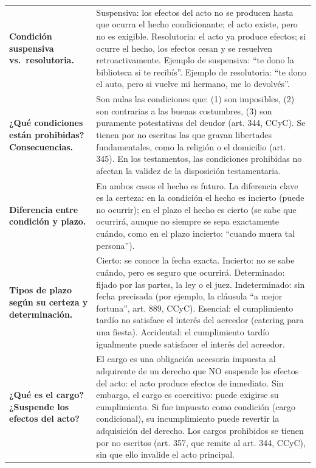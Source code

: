 \documentclass[12pt,oneside]{book}
\begin{document}
\begin{longtable}{
    >{\raggedright\arraybackslash}p{}
    >{\raggedright\arraybackslash}p{}
}
\textbf{Condición suspensiva vs.\ resolutoria.} &
Suspensiva: los efectos del acto no se producen hasta que ocurra el hecho condicionante; el acto existe, pero no es exigible. Resolutoria: el acto ya produce efectos; si ocurre el hecho, los efectos cesan y se resuelven retroactivamente. Ejemplo de suspensiva: ``te dono la biblioteca si te recibís''. Ejemplo de resolutoria: ``te dono el auto, pero si vuelve mi hermano, me lo devolvés''. \\

\textbf{¿Qué condiciones están prohibidas? Consecuencias.} &
Son nulas las condiciones que: (1) son imposibles, (2) son contrarias a las buenas costumbres, (3) son puramente potestativas del deudor (art. 344, CCyC). Se tienen por no escritas las que gravan libertades fundamentales, como la religión o el domicilio (art. 345). En los testamentos, las condiciones prohibidas no afectan la validez de la disposición testamentaria. \\

\textbf{Diferencia entre condición y plazo.} &
En ambos casos el hecho es futuro. La diferencia clave es la certeza: en la condición el hecho es incierto (puede no ocurrir); en el plazo el hecho es cierto (se sabe que ocurrirá, aunque no siempre se sepa exactamente cuándo, como en el plazo incierto: ``cuando muera tal persona''). \\

\textbf{Tipos de plazo según su certeza y determinación.} &
Cierto: se conoce la fecha exacta. Incierto: no se sabe cuándo, pero es seguro que ocurrirá. Determinado: fijado por las partes, la ley o el juez. Indeterminado: sin fecha precisada (por ejemplo, la cláusula ``a mejor fortuna'', art. 889, CCyC). Esencial: el cumplimiento tardío no satisface el interés del acreedor (catering para una fiesta). Accidental: el cumplimiento tardío igualmente puede satisfacer el interés del acreedor. \\

\textbf{¿Qué es el cargo? ¿Suspende los efectos del acto?} &
El cargo es una obligación accesoria impuesta al adquirente de un derecho que NO suspende los efectos del acto: el acto produce efectos de inmediato. Sin embargo, el cargo es coercitivo: puede exigirse su cumplimiento. Si fue impuesto como condición (cargo condicional), su incumplimiento puede revertir la adquisición del derecho. Los cargos prohibidos se tienen por no escritos (art. 357, que remite al art. 344, CCyC), sin que ello invalide el acto principal. \\


\end{longtable}
\end{document}

